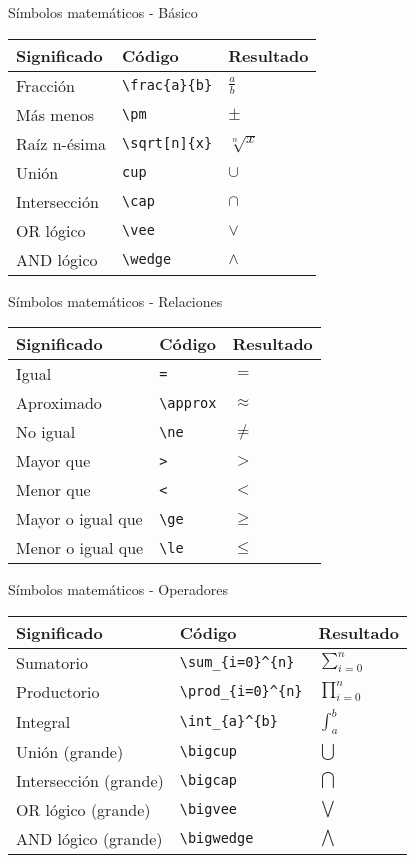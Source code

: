 \documentclass[
  ignorenonframetext,
]{beamer}
\begin{document}
\begin{frame}[fragile]{Símbolos matemáticos - Básico}
\protect\hypertarget{suxedmbolos-matemuxe1ticos---buxe1sico-1}{}
\begin{longtable}[]{@{}lll@{}}
\toprule
Significado & Código & Resultado\tabularnewline
\midrule
\endhead
Fracción & \texttt{\textbackslash{}frac\{a\}\{b\}} &
\(\frac{a}{b}\)\tabularnewline
Más menos & \texttt{\textbackslash{}pm} & \(\pm\)\tabularnewline
Raíz n-ésima & \texttt{\textbackslash{}sqrt{[}n{]}\{x\}} &
\(\sqrt[n]{x}\)\tabularnewline
Unión & \texttt{cup} & \(\cup\)\tabularnewline
Intersección & \texttt{\textbackslash{}cap} & \(\cap\)\tabularnewline
OR lógico & \texttt{\textbackslash{}vee} & \(\vee\)\tabularnewline
AND lógico & \texttt{\textbackslash{}wedge} & \(\wedge\)\tabularnewline
\bottomrule
\end{longtable}
\end{frame}

\begin{frame}[fragile]{Símbolos matemáticos - Relaciones}
\protect\hypertarget{suxedmbolos-matemuxe1ticos---relaciones}{}
\begin{longtable}[]{@{}lll@{}}
\toprule
Significado & Código & Resultado\tabularnewline
\midrule
\endhead
Igual & \texttt{=} & \(=\)\tabularnewline
Aproximado & \texttt{\textbackslash{}approx} &
\(\approx\)\tabularnewline
No igual & \texttt{\textbackslash{}ne} & \(\ne\)\tabularnewline
Mayor que & \texttt{\textgreater{}} & \(>\)\tabularnewline
Menor que & \texttt{\textless{}} & \(<\)\tabularnewline
Mayor o igual que & \texttt{\textbackslash{}ge} & \(\ge\)\tabularnewline
Menor o igual que & \texttt{\textbackslash{}le} & \(\le\)\tabularnewline
\bottomrule
\end{longtable}
\end{frame}

\begin{frame}[fragile]{Símbolos matemáticos - Operadores}
\protect\hypertarget{suxedmbolos-matemuxe1ticos---operadores}{}
\begin{longtable}[]{@{}lll@{}}
\toprule
Significado & Código & Resultado\tabularnewline
\midrule
\endhead
Sumatorio & \texttt{\textbackslash{}sum\_\{i=0\}\^{}\{n\}} &
\(\sum_{i=0}^{n}\)\tabularnewline
Productorio & \texttt{\textbackslash{}prod\_\{i=0\}\^{}\{n\}} &
\(\prod_{i=0}^{n}\)\tabularnewline
Integral & \texttt{\textbackslash{}int\_\{a\}\^{}\{b\}} &
\(\int_{a}^{b}\)\tabularnewline
Unión (grande) & \texttt{\textbackslash{}bigcup} &
\(\bigcup\)\tabularnewline
Intersección (grande) & \texttt{\textbackslash{}bigcap} &
\(\bigcap\)\tabularnewline
OR lógico (grande) & \texttt{\textbackslash{}bigvee} &
\(\bigvee\)\tabularnewline
AND lógico (grande) & \texttt{\textbackslash{}bigwedge} &
\(\bigwedge\)\tabularnewline
\bottomrule
\end{longtable}
\end{frame}
\end{document}
